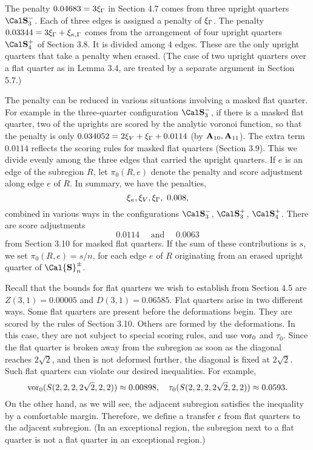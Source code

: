 The penalty $0.04683 = 3\xi_\Gamma$ in Section 4.7 comes from
three upright quarters $\Sminus$.   Each of
three edges is assigned a penalty of $\xi_\Gamma$.  The penalty
$0.03344=3\xi_\Gamma+\xi_{\kappa,\Gamma}$ 
comes from the arrangement of four upright quarters
$\Sfour$ of Section 3.8.  
It is divided among 4 edges. These are the
only upright quarters that take a penalty when erased.
(The case of two upright quarters over a flat quarter as in Lemma 3.4,
are treated by a separate argument in Section 5.7.)

The penalty can be reduced in various situations involving a masked
flat quarter.  For example in the three-quarter configuration
$\Sminus$, 
if there is a masked flat quarter, two of the uprights
are scored by the analytic voronoi function, so that the penalty
is only $0.034052=2\xi_V+\xi_\Gamma+0.0114$
(by ${\bold A}_{10},{\bold A}_{11}$).  The extra term $0.0114$
reflects the scoring rules for masked flat quarters (Section 3.9).  This we
divide evenly among the three edges that carried the upright
quarters.
If $e$ is an edge of the subregion $R$, let $\pi_0(R,e)$ denote the
penalty and score adjustment along edge $e$ of $R$.  In summary,
we have the penalties,
	$$\xi_\kappa,\xi_V,\xi_\Gamma,\ 0.008,$$
combined in various ways in the configurations $\Sminus$, $\Splus$,
$\Sfour$.  There are score adjustments
$$0.0114\quad \text{ and }\quad 0.0063$$
from Section 3.10 for masked flat quarters.  If the sum of
these contributions is $s$, we set $\pi_0(R,e)=s/n$, for
each edge $e$ of $R$ originating from an erased upright quarter
of $\Cal{\bold S}_n^\pm$.

Recall that the bounds for flat quarters we wish to establish from
Section 4.5 are
$Z(3,1)=0.00005$ and $D(3,1)=0.06585$.  
Flat quarters arise
in two different ways.  Some flat quarters are present before the
deformations begin.  They are scored by the rules of Section 3.10.
Others are formed by the deformations.  In this case, they are
not subject to special scoring rules, and use $\operatorname{vor}_0$ and $\tau_0$.
Since the flat quarter is broken away from the subregion
 as soon as the diagonal reaches
$2\sqrt{2}$, and then is not deformed further, the diagonal
is fixed at $2\sqrt{2}$.  Such flat quarters can violate our
desired inequalities. For example,
$$\operatorname{vor}_0(S(2,2,2,2\sqrt{2},2,2)) \approx 0.00898,\quad
	\tau_0(S(2,2,2,2\sqrt{2},2,2))\approx 0.0593.$$
On the other hand, as we will see, the adjacent subregion satisfies the
inequality by a comfortable margin.  Therefore, we define a transfer
$\epsilon$ from flat quarters to the adjacent subregion.
(In an exceptional region, 
the subregion next to a flat quarter is not a flat quarter
in an exceptional region.)

